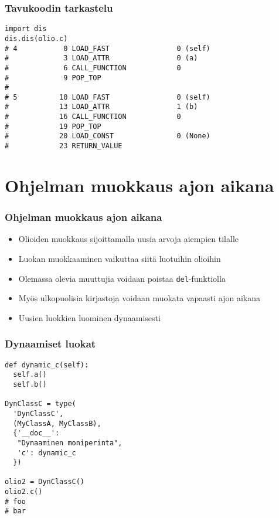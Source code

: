 \documentclass{beamer}
\begin{document}
\begin{frame}[fragile]
\frametitle{Tavukoodin tarkastelu}
\begin{verbatim}
import dis
dis.dis(olio.c)
# 4           0 LOAD_FAST                0 (self)
#             3 LOAD_ATTR                0 (a)
#             6 CALL_FUNCTION            0
#             9 POP_TOP             
#
# 5          10 LOAD_FAST                0 (self)
#            13 LOAD_ATTR                1 (b)
#            16 CALL_FUNCTION            0
#            19 POP_TOP             
#            20 LOAD_CONST               0 (None)
#            23 RETURN_VALUE        
\end{verbatim}
\end{frame}


\section{Ohjelman muokkaus ajon aikana}


\begin{frame}[fragile]
\frametitle{Ohjelman muokkaus ajon aikana}
\begin{itemize}
\item{Olioiden muokkaus sijoittamalla uusia arvoja aiempien tilalle}
\item{Luokan muokkaaminen vaikuttaa siitä luotuihin olioihin}
\item{Olemassa olevia muuttujia voidaan poistaa \verb|del|-funktiolla}
\item{Myös ulkopuolisia kirjastoja voidaan muokata vapaasti ajon aikana}
\item{Uusien luokkien luominen dynaamisesti}
\end{itemize}
\end{frame}


\begin{frame}[fragile]
\frametitle{Dynaamiset luokat}
\begin{verbatim}
def dynamic_c(self):
  self.a()
  self.b()

DynClassC = type(
  'DynClassC', 
  (MyClassA, MyClassB), 
  {'__doc__': 
   "Dynaaminen moniperinta", 
   'c': dynamic_c
  })

olio2 = DynClassC()
olio2.c()
# foo    
# bar
\end{verbatim}
\end{frame}

\end{document}
